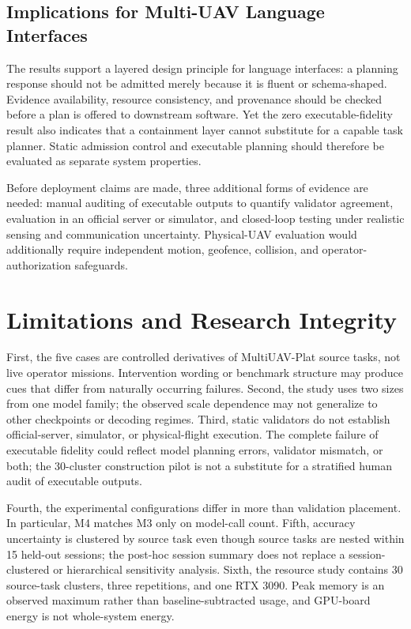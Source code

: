 \documentclass[conference]{IEEEtran}
\newcommand{\Mthree}{\textsc{M3}\xspace}
\newcommand{\Mfour}{\textsc{M4}\xspace}
\begin{document}
\subsection{Implications for Multi-UAV Language Interfaces}

The results support a layered design principle for language interfaces: a
planning response should not be admitted merely because it is fluent or
schema-shaped. Evidence availability, resource consistency, and provenance
should be checked before a plan is offered to downstream software. Yet the
zero executable-fidelity result also indicates that a containment layer cannot
substitute for a capable task planner. Static admission control and executable
planning should therefore be evaluated as separate system properties.

Before deployment claims are made, three additional forms of evidence are
needed: manual auditing of executable outputs to quantify validator agreement,
evaluation in an official server or simulator, and closed-loop testing under
realistic sensing and communication uncertainty. Physical-UAV evaluation
would additionally require independent motion, geofence, collision, and
operator-authorization safeguards.

\section{Limitations and Research Integrity}

First, the five cases are controlled derivatives of MultiUAV-Plat source tasks,
not live operator missions. Intervention wording or benchmark structure may
produce cues that differ from naturally occurring failures. Second, the study
uses two sizes from one model family; the observed scale dependence may not
generalize to other checkpoints or decoding regimes. Third, static validators
do not establish official-server, simulator, or physical-flight execution.
The complete failure of executable fidelity could reflect model planning
errors, validator mismatch, or both; the 30-cluster construction pilot is not a
substitute for a stratified human audit of executable outputs.

Fourth, the experimental configurations differ in more than validation
placement. In particular, \Mfour matches \Mthree only on model-call count.
Fifth, accuracy uncertainty is clustered by source task even though source
tasks are nested within 15 held-out sessions; the post-hoc session summary does
not replace a session-clustered or hierarchical sensitivity analysis. Sixth,
the resource study contains 30 source-task clusters, three repetitions, and one
RTX 3090. Peak memory is an observed maximum rather than baseline-subtracted
usage, and GPU-board energy is not whole-system energy.
\end{document}
